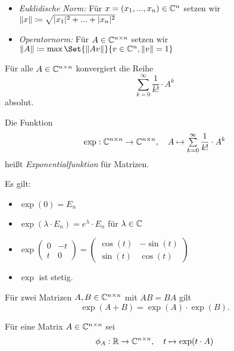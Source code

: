 \documentclass{cheat-sheet}
\begin{document}
\begin{defn}
  \begin{itemize}
    \item \emph{Euklidische Norm:} Für $x = (x_1, ..., x_n) \in \mathbb{C}^n$ setzen wir $\lVert x\rVert \coloneqq \sqrt{\lvert x_1\rvert^2 + ... + \lvert x_n\rvert^2}$
    \item \emph{Operatornorm:} Für $A \in \mathbb{C}^{n \times n}$ setzen wir $\norm{A} \coloneqq \max \Set{ \norm{Av} }{ v \in \C^n, \norm{v} = 1 }$
  \end{itemize}
\end{defn}


\begin{satz}
  Für alle $A \in \mathbb{C}^{n \times n}$ konvergiert die Reihe
  \[ \sum_{k=0}^\infty \frac{1}{k!} \cdot A^k \]
  absolut.
\end{satz}

\begin{defn}
  Die Funktion
  \[ \exp : \C^{n \times n} \to \C^{n \times n}, \quad A \mapsto \sum_{k=0}^{\infty} \frac{1}{k!} \cdot A^k \]
  heißt \emph{Exponentialfunktion} für Matrizen.
\end{defn}

\begin{bem}
  Es gilt:
  \begin{itemize}
    \item $\exp(0) = E_n$
    \item $\exp(\lambda \cdot E_n) = e^\lambda \cdot E_n$ für $\lambda \in \mathbb{C}$
    \item $\exp \begin{pmatrix} 0 & -t \\ t & 0 \end{pmatrix} = \begin{pmatrix} \cos(t) & -\sin(t) \\ \sin(t) & \cos(t) \end{pmatrix}$
    \item $\exp$ ist stetig.
  \end{itemize}
\end{bem}

\begin{satz}
  Für zwei Matrizen $A, B \in \mathbb{C}^{n \times n}$ mit $AB = BA$ gilt
  \[ \exp(A + B) = \exp(A) \cdot \exp(B). \]
\end{satz}

\begin{defn}
  Für eine Matrix $A \in \mathbb{C}^{n \times n}$ sei
  \[ \phi_A : \mathbb{R} \to \mathbb{C}^{n \times n},\quad t \mapsto \exp(t \cdot A) \]
\end{defn}
\end{document}
